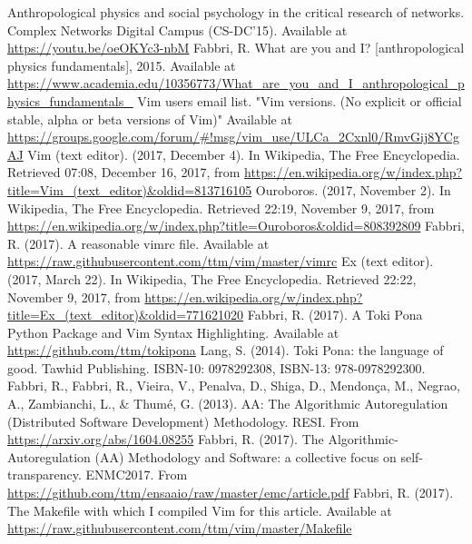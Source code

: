 \documentclass{article}
\begin{document}
\begin{thebibliography}{99}
\fontsize{11}{0}\selectfont
{}
	Anthropological physics and social psychology in the critical research of networks. Complex Networks Digital Campus (CS-DC'15).
	Available at \url{https://youtu.be/oeOKYc3-nbM}
	Fabbri, R. What are you and I? [anthropological physics fundamentals], 2015. Available at \url{https://www.academia.edu/10356773/What_are_you_and_I_anthropological_physics_fundamentals_}
  Vim users email list. "Vim versions. (No explicit or official stable, alpha or beta versions of Vim)" Available at \url{https://groups.google.com/forum/#!msg/vim_use/ULCa_2Cxnl0/RmvGij8YCgAJ} 
  Vim (text editor). (2017, December 4). In Wikipedia, The Free
    Encyclopedia. Retrieved 07:08, December 16, 2017, from
    \url{https://en.wikipedia.org/w/index.php?title=Vim_(text_editor)&oldid=813716105}
  Ouroboros. (2017, November 2). In Wikipedia, The Free Encyclopedia. Retrieved 22:19, November 9, 2017, from \url{https://en.wikipedia.org/w/index.php?title=Ouroboros&oldid=808392809}
	Fabbri, R. (2017). A reasonable vimrc file. Available at \url{https://raw.githubusercontent.com/ttm/vim/master/vimrc} 
  Ex (text editor). (2017, March 22). In Wikipedia, The Free Encyclopedia. Retrieved 22:22, November 9, 2017, from \url{https://en.wikipedia.org/w/index.php?title=Ex_(text_editor)&oldid=771621020}
	Fabbri, R. (2017). A Toki Pona Python Package and Vim Syntax Highlighting. Available at \url{https://github.com/ttm/tokipona} 
	Lang, S. (2014). Toki Pona: the language of good. Tawhid Publishing.
    ISBN-10: 0978292308, ISBN-13: 978-0978292300.
	Fabbri, R., Fabbri, R., Vieira, V., Penalva, D., Shiga, D., Mendonça, M., Negrao, A., Zambianchi, L., \& Thumé, G. (2013). AA: The Algorithmic Autoregulation (Distributed Software Development) Methodology. RESI. From \url{https://arxiv.org/abs/1604.08255}
	Fabbri, R. (2017).
The Algorithmic-Autoregulation (AA) Methodology and Software:
a collective focus on self-transparency. ENMC2017. From \url{https://github.com/ttm/ensaaio/raw/master/emc/article.pdf} 
	Fabbri, R. (2017). The Makefile with which I compiled Vim for this article. Available at \url{https://raw.githubusercontent.com/ttm/vim/master/Makefile} 
\end{thebibliography}
\end{document}
